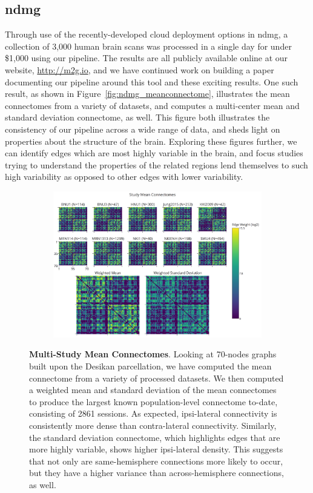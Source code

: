 \documentclass[simplex.tex]{subfiles}
\begin{document}
\subsection{ndmg}

Through use of the recently-developed cloud deployment options in ndmg, a collection of 3,000 human brain scans was
processed in a single day for under \$1,000 using our pipeline. The results are all publicly available online at our
website, \url{http://m2g.io}, and we have continued work on building a paper documenting our pipeline around this tool
and these exciting results. One such result, as shown in Figure~\ref{fig:ndmg_meanconnectome}, illustrates the mean
connectomes from a variety of datasets, and computes a multi-center mean and standard deviation connectome, as well.
This figure both illustrates the consistency of our pipeline across a wide range of data, and sheds light on properties
about the structure of the brain. Exploring these figures further, we can identify edges which are most highly variable
in the brain, and focus studies trying to understand the properties of the related regions lend themselves to such high
variability as opposed to other edges with lower variability.

\begin{figure}[h!]
\begin{cframed}[lgray]
\centering
\begin{subfigure}[h]{1\textwidth}
\includegraphics[width=\textwidth]{../../figs/fig_meanconnectome.png}
\end{subfigure}
\caption{\textbf{Multi-Study Mean Connectomes}. Looking at 70-nodes graphs built upon the Desikan parcellation, we have
computed the mean connectome from a variety of processed datasets. We then computed a weighted mean and standard
deviation of the mean connectomes to produce the largest known population-level connectome to-date, consisting of 2861
sessions. As expected, ipsi-lateral connectivity is consistently more dense than contra-lateral connectivity.
Similarly, the standard deviation connectome, which highlights edges that are more highly variable, shows higher
ipsi-lateral density. This suggests that not only are same-hemisphere connections more likely to occur, but they have
a higher variance than across-hemisphere connections, as well.}
\label{fig:mean}
\end{cframed}
\end{figure}
\end{document}
